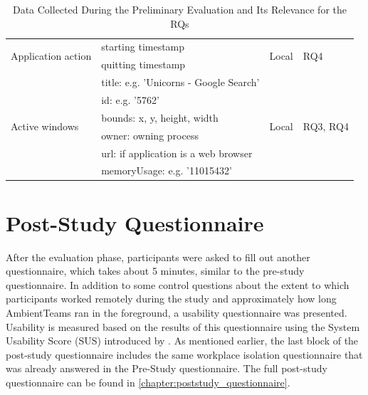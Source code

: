 \begin{table}[h]
\begin{tabularx}{.9\textwidth}{l X l l}
        \midrule
        \multirow{2}{*}{Application action}  & starting timestamp                     & \multirow{2}{*}{Local}  & \multirow{2}{*}{RQ4    }      \\
                                             & quitting timestamp                     &                         &                               \\


        \midrule
        \multirow{6}{*}{Active windows}      & title: e.g. 'Unicorns - Google Search' & \multirow{6}{*}{Local}  & \multirow{6}{*}{RQ3, RQ4}     \\
                                             & id: e.g. '5762'                        &                         &                               \\
                                             & bounds: x, y, height, width            &                         &                               \\
                                             & owner: owning process                  &                         &                               \\
                                             & url: if application is a web browser   &                         &                               \\
                                             & memoryUsage: e.g. '11015432'           &                         &                               \\
        \bottomrule
    \end{tabularx}
    \caption{Data Collected During the Preliminary Evaluation and Its Relevance for the RQs}
    \label{table:data}
\end{table}

\section{Post-Study Questionnaire}
\label{section:poststudy_questionnaire}
After the evaluation phase, participants were asked to fill out another questionnaire, which takes about 5 minutes, similar to the pre-study questionnaire. In addition to some control questions about the extent to which participants worked remotely during the study and approximately how long AmbientTeams ran in the foreground, a usability questionnaire was presented. Usability is measured based on the results of this questionnaire using the System Usability Score (SUS) introduced by \textcite{brooke1996sus}. As mentioned earlier, the last block of the post-study questionnaire includes the same workplace isolation questionnaire that was already answered in the Pre-Study questionnaire. The full post-study questionnaire can be found in \autoref{chapter:poststudy_questionnaire}.

